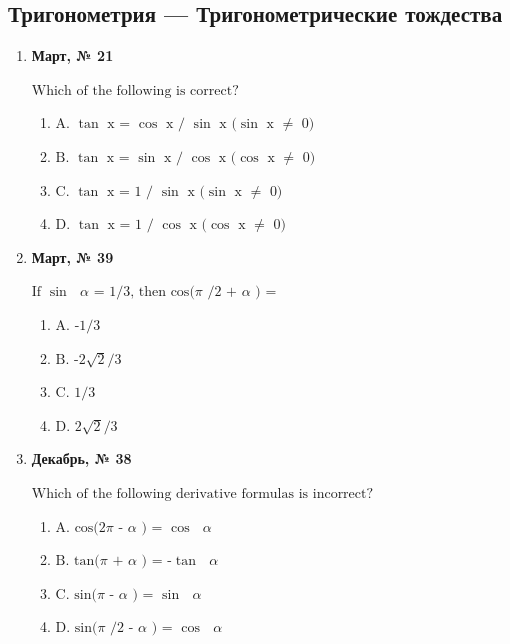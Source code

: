 \subsection*{Тригонометрия — Тригонометрические тождества}
\begin{enumerate}
\item \textbf{Март, № 21} \par \smallskip
$\displaystyle \text{Which of the following is correct?}$
\begin{enumerate}
\item $\displaystyle \text{A. }\tan\text{ x = }\cos\text{ x / }\sin\text{ x (}\sin\text{ x }\neq\text{  0)}$
\item $\displaystyle \text{B. }\tan\text{ x = }\sin\text{ x / }\cos\text{ x (}\cos\text{ x }\neq\text{  0)}$
\item $\displaystyle \text{C. }\tan\text{ x = 1 / }\sin\text{ x (}\sin\text{ x }\neq\text{  0)}$
\item $\displaystyle \text{D. }\tan\text{ x = 1 / }\cos\text{ x (}\cos\text{ x }\neq\text{  0)}$
\end{enumerate}
\item \textbf{Март, № 39} \par \smallskip
$\displaystyle \text{If }\sin\text{ }\alpha\text{  = 1/3, then cos(}\pi\text{ /2 + }\alpha\text{ ) =}$
\begin{enumerate}
\item $\displaystyle \text{A. -1/3}$
\item $\displaystyle \text{B. -2}\sqrt{2}\text{/3}$
\item $\displaystyle \text{C. 1/3}$
\item $\displaystyle \text{D. 2}\sqrt{2}\text{/3}$
\end{enumerate}
\item \textbf{Декабрь, № 38} \par \smallskip
$\displaystyle \text{Which of the following derivative formulas is incorrect?}$
\begin{enumerate}
\item $\displaystyle \text{A. cos(2}\pi\text{  - }\alpha\text{ ) = }\cos\text{ }\alpha\text{ }$
\item $\displaystyle \text{B. tan(}\pi\text{  + }\alpha\text{ ) = -}\tan\text{ }\alpha\text{ }$
\item $\displaystyle \text{C. sin(}\pi\text{  - }\alpha\text{ ) = }\sin\text{ }\alpha\text{ }$
\item $\displaystyle \text{D. sin(}\pi\text{ /2 - }\alpha\text{ ) = }\cos\text{ }\alpha\text{ }$

\end{enumerate}
\end{enumerate}
